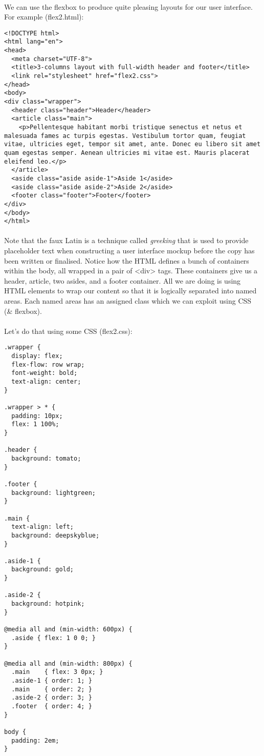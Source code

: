 \documentclass[10pt, a4paper, twosize]{article}
\begin{document}
\paragraph{} We can use the flexbox to produce quite pleasing layouts for our user interface. For example (flex2.html):
\begin{lstlisting}
<!DOCTYPE html>
<html lang="en">
<head>
  <meta charset="UTF-8">
  <title>3-columns layout with full-width header and footer</title>
  <link rel="stylesheet" href="flex2.css">
</head>
<body>
<div class="wrapper">
  <header class="header">Header</header>
  <article class="main">
    <p>Pellentesque habitant morbi tristique senectus et netus et malesuada fames ac turpis egestas. Vestibulum tortor quam, feugiat vitae, ultricies eget, tempor sit amet, ante. Donec eu libero sit amet quam egestas semper. Aenean ultricies mi vitae est. Mauris placerat eleifend leo.</p>  
  </article>
  <aside class="aside aside-1">Aside 1</aside>
  <aside class="aside aside-2">Aside 2</aside>
  <footer class="footer">Footer</footer>
</div>
</body>
</html>
\end{lstlisting}
\paragraph{} Note that the faux Latin is a technique called \emph{greeking} that is used to provide placeholder text when constructing a user interface mockup before the copy has been written or finalised. Notice how the HTML defines a bunch of containers within the body, all wrapped in a pair of <div> tags. These containers give us a header, article, two asides, and a footer container. All we are doing is using HTML elements to wrap our content so that it is logically separated into named areas. Each named areas has an assigned class which we can exploit using CSS (\& flexbox).

\paragraph{} Let's do that using some CSS (flex2.css):
\begin{lstlisting}
.wrapper {
  display: flex;  
  flex-flow: row wrap;
  font-weight: bold;
  text-align: center;
}

.wrapper > * {
  padding: 10px;
  flex: 1 100%;
}

.header {
  background: tomato;
}

.footer {
  background: lightgreen;
}

.main {
  text-align: left;
  background: deepskyblue;
}

.aside-1 {
  background: gold;
}

.aside-2 {
  background: hotpink;
}

@media all and (min-width: 600px) {
  .aside { flex: 1 0 0; }
}

@media all and (min-width: 800px) {
  .main    { flex: 3 0px; }
  .aside-1 { order: 1; } 
  .main    { order: 2; }
  .aside-2 { order: 3; }
  .footer  { order: 4; }
}

body {
  padding: 2em; 
}
\end{lstlisting}
\end{document}
